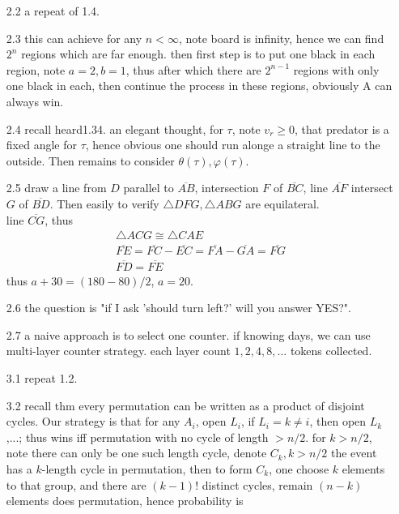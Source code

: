 \documentclass[paper=a4, fontsize=11pt]{scrartcl} %
\numberwithin{equation}{section} %
\numberwithin{figure}{section} %
\numberwithin{table}{section} %
\begin{document}
\begin{itemize}
	 \item[2.2] a repeat of 1.4.
	 \item[2.3] this can achieve for any $n<\infty$, note board is infinity, hence we can find $2^n$ regions which are far enough. then first step is to put one black in each region, note $a=2,b=1$, thus after which there are $2^{n-1}$ regions with only one black in each, then continue the process in these regions, obviously A can always win.
	 \item[2.4] recall heard1.34. an elegant thought, for $\tau$, note $v_r\geq 0$, that predator is a fixed angle for $\tau$, hence obvious one should run alonge a straight line to the outside. Then remains to consider $\theta(\tau),\varphi(\tau)$.
	 \item[2.5] draw a line from $D$ parallel to $\overline{AB}$, intersection $F$ of $\overline{BC}$, line $\overline{AF}$ intersect $G$ of $\overline{BD}$. Then easily to verify $\bigtriangleup DFG,\bigtriangleup ABG$ are equilateral.\\
	 line $\overline{CG}$, thus
	 \begin{align}
	 	\bigtriangleup ACG \cong \bigtriangleup CAE \\
	 	\overline{FE} = \overline{FC} -\overline{EC} = \overline{FA} - \overline{GA} = \overline{FG}\\
	 	\overline{FD} = \overline{FE}
	 \end{align}
	 thus $a+30 = (180-80)/2$, $a = 20$.
	 \item[2.6] the question is "if I ask 'should turn left?' will you answer YES?".
	 \item[2.7] a naive approach is to select one counter. if knowing days, we can use multi-layer counter strategy. each layer count $1,2,4,8,...$ tokens collected.
	 \item[3.1] repeat 1.2.
	 \item[3.2] recall thm every permutation can be written as a product of disjoint cycles. Our strategy is that for any $A_i$, open $L_i$, if $L_i=k\neq i$, then open $L_k$,...; thus wins iff permutation with no cycle of length $>n/2$. for $k>n/2$, note there can only be one such length cycle, denote $C_k,k>n/2$ the event has a $k$-length cycle in permutation, then to form $C_k$, one choose $k$ elements to that group, and there are $(k-1)!$ distinct cycles, remain $(n-k)$ elements does permutation, hence probability is

\end{itemize}
\end{document}
